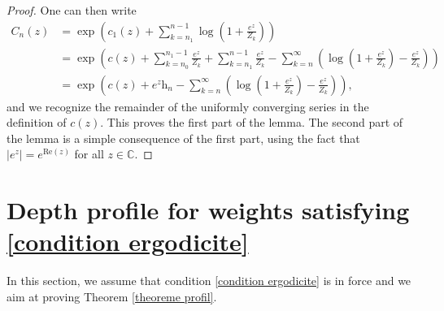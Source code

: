 \documentclass[11pt]{article}
\numberwithin{equation}{section}
\def \C{\mathbb{C}}
\renewcommand{\Re}{\mathrm{Re}}
\begin{document}
\begin{proof}
	One can then write
	\begin{align*}
	C_n(z) &= \exp\left(c_1(z) + \sum_{k=n_1}^{n-1}  \log \left(1+ \frac{e^z}{Z_k} \right) \right)\\
	&=\exp\left(c(z) + \sum_{k=n_0}^{n_1 -1} \frac{e^z}{Z_k} +  \sum_{k=n_1}^{n -1} \frac{e^z}{Z_k}- \sum_{k=n}^\infty \left( \log \left(1+ \frac{e^z}{Z_k} \right) - \frac{e^z}{Z_k}\right) \right)\\
	&=\exp\left( c(z) + e^z \mathrm{h}_n -\sum_{k=n}^\infty \left( \log \left(1+ \frac{e^z}{Z_k} \right) - \frac{e^z}{Z_k}\right) \right),
	\end{align*}
	and we recognize the remainder of the uniformly converging series in the definition of $c(z)$. This proves the first part of the lemma. The second part of the lemma is a simple consequence of the first part, using the fact that $\vert e^z\vert  = e^{\Re(z)}$ for all $z \in \C$.
\end{proof}







\section{Depth profile for weights satisfying \eqref{condition ergodicite}}\label{section profil}
In this section, we assume that condition \eqref{condition ergodicite} is in force and we aim at proving Theorem \ref{theoreme profil}. 
\end{document}
